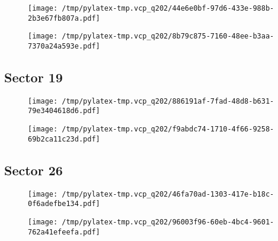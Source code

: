 \documentclass{report}%
\begin{document}
\begin{figure}[H]%
\begin{center}%
\centering%
\texttt{[image: /tmp/pylatex-tmp.vcp\_q202/44e6e0bf-97d6-433e-988b-2b3e67fb807a.pdf]}%
\end{center}%
\end{figure}

%


\begin{figure}[H]%
\begin{center}%
\centering%
\texttt{[image: /tmp/pylatex-tmp.vcp\_q202/8b79c875-7160-48ee-b3aa-7370a24a593e.pdf]}%
\end{center}%
\end{figure}

%
\subsection{Sector 19}%
\label{subsec:40298066419}%


\begin{figure}[H]%
\begin{center}%
\centering%
\texttt{[image: /tmp/pylatex-tmp.vcp\_q202/886191af-7fad-48d8-b631-79e3404618d6.pdf]}%
\end{center}%
\end{figure}

%


\begin{figure}[H]%
\begin{center}%
\centering%
\texttt{[image: /tmp/pylatex-tmp.vcp\_q202/f9abdc74-1710-4f66-9258-69b2ca11c23d.pdf]}%
\end{center}%
\end{figure}

%
\subsection{Sector 26}%
\label{subsec:40298066426}%


\begin{figure}[H]%
\begin{center}%
\centering%
\texttt{[image: /tmp/pylatex-tmp.vcp\_q202/46fa70ad-1303-417e-b18c-0f6adefbe134.pdf]}%
\end{center}%
\end{figure}

%


\begin{figure}[H]%
\begin{center}%
\centering%
\texttt{[image: /tmp/pylatex-tmp.vcp\_q202/96003f96-60eb-4bc4-9601-762a41efeefa.pdf]}%
\end{center}%
\end{figure}
\end{document}
